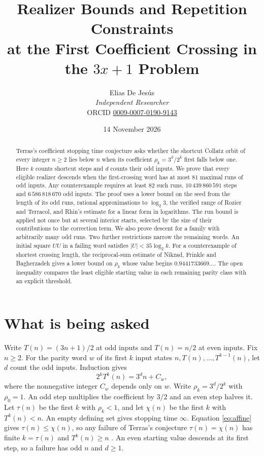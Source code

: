 \documentclass[11pt,a4paper]{article}
\title{Realizer Bounds and Repetition Constraints\\ at the First Coefficient Crossing in the $3x+1$ Problem}
\author{Elias De Jes\'us\\ \textit{Independent Researcher}\\
ORCID \href{https://orcid.org/0009-0007-0190-9143}{0009-0007-0190-9143}}
\date{14 November 2026}
\theoremstyle{plain}\newtheorem{theorem}{Theorem}\newtheorem{proposition}[theorem]{Proposition}
\theoremstyle{definition}\newtheorem{example}[theorem]{Example}
\theoremstyle{remark}\newtheorem{remark}[theorem]{Remark}
\begin{document}
\maketitle

\begin{abstract}
Terras's coefficient stopping time conjecture asks whether the shortcut Collatz orbit of every
integer $n\ge2$ lies below $n$ when its coefficient $\rho_k=3^d/2^k$ first falls below one.
Here $k$ counts shortcut steps and $d$ counts their odd inputs. We prove that every eligible
realizer descends when the first-crossing word has at most $81$ maximal runs of odd inputs.
Any counterexample requires at least $82$ such runs, $10\,439\,860\,591$ steps and
$6\,586\,818\,670$ odd inputs. The proof uses a lower bound on the seed from the length of its
odd runs, rational approximations to $\log_2 3$, the verified range of Rozier and Terracol,
and Rhin's estimate for a linear form in logarithms. The run bound is applied not once but at
several interior starts, selected by the size of their contributions to the correction term. We also prove descent for a family with
arbitrarily many odd runs. Two further restrictions narrow the remaining words. An initial
square $UU$ in a failing word satisfies $|U|<35\log_2 k$. For a counterexample of shortest
crossing length, the reciprocal-sum estimate of Nikzad, Frinkle and Bagherzadeh gives a lower
bound on $\rho_k$ whose value begins $0.9441733669\ldots$. The open inequality compares
the least eligible starting value in each remaining parity class with an explicit threshold.
\end{abstract}

\section{What is being asked}
Write $T(n)=(3n+1)/2$ at odd inputs and $T(n)=n/2$ at even inputs. Fix $n\ge2$.
For the parity word $w$ of its first $k$ input states $n,T(n),\dots,T^{k-1}(n)$, let $d$
count the odd inputs. Induction gives
\begin{equation}\label{eq:affine}
2^kT^k(n)=3^dn+C_w,
\end{equation}
where the nonnegative integer $C_w$ depends only on $w$. Write $\rho_k=3^d/2^k$ with
$\rho_0=1$. An odd step multiplies the coefficient by $3/2$ and an even step halves it.
Let $\tau(n)$ be the first $k$ with $\rho_k<1$, and let $\chi(n)$ be the first $k$
with $T^k(n)<n$. An empty defining set gives stopping time $\infty$.
Equation \eqref{eq:affine} gives $\tau(n)\le\chi(n)$, so any failure of Terras's conjecture
$\tau(n)=\chi(n)$ has finite $k=\tau(n)$ and $T^k(n)\ge n$
\cite{terras1976,hikawa2026}. An even starting value descends at its first step, so a failure
has odd $n$ and $d\ge1$.
\end{document}
